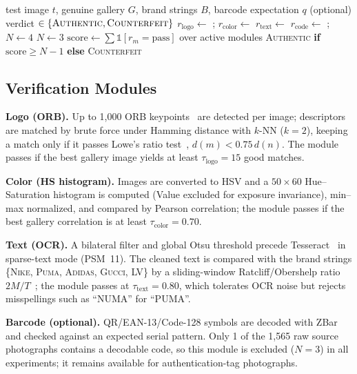 \documentclass[conference]{IEEEtran}
\begin{document}
\begin{algorithm}[t]
\caption{Master Comparator Verification}
\label{alg:cascade}
\begin{algorithmic}[1]
\Require test image $t$, genuine gallery $G$, brand strings $B$, barcode expectation $q$ (optional)
\Ensure verdict $\in \{\textsc{Authentic}, \textsc{Counterfeit}\}$
\State $r_{\text{logo}} \gets$ ; $r_{\text{color}} \gets$ 
\State $r_{\text{text}} \gets$ 
    \State $r_{\text{code}} \gets$ ; $N \gets 4$
\Else
    \State $N \gets 3$
\EndIf
\State $\text{score} \gets \sum \mathbb{1}[r_m = \text{pass}]$ over active modules
\State \Return \textsc{Authentic} \textbf{if} $\text{score} \geq N - 1$ \textbf{else} \textsc{Counterfeit}
\end{algorithmic}
\end{algorithm}

\subsection{Verification Modules}
\label{sec:modules}

\textbf{Logo (ORB).} Up to 1{,}000 ORB keypoints~\cite{orb2011} are
detected per image; descriptors are matched by brute force under Hamming
distance with $k$-NN ($k{=}2$), keeping a match only if it passes Lowe's
ratio test~\cite{lowe2004}, $d(m) < 0.75\, d(n)$. The module passes if the
best gallery image yields at least $\tau_{\text{logo}}{=}15$ good matches.

\textbf{Color (HS histogram).} Images are converted to HSV and a
$50\times60$ Hue--Saturation histogram is computed (Value excluded for
exposure invariance), min--max normalized, and compared by Pearson
correlation; the module passes if the best gallery correlation is at
least $\tau_{\text{color}}{=}0.70$.

\textbf{Text (OCR).} A bilateral filter and global Otsu threshold precede
Tesseract~\cite{tesseract2007} in sparse-text mode (PSM~11). The cleaned
text is compared with the brand strings \{\textsc{Nike}, \textsc{Puma},
\textsc{Adidas}, \textsc{Gucci}, \textsc{LV}\} by a sliding-window
Ratcliff/Obershelp ratio $2M/T$~\cite{ratcliff1988}; the module passes at
$\tau_{\text{text}}{=}0.80$, which tolerates OCR noise but rejects
misspellings such as ``NUMA'' for ``PUMA''.

\textbf{Barcode (optional).} QR/EAN-13/Code-128 symbols are decoded with
ZBar~\cite{zbar} and checked against an expected serial pattern. Only 1 of
the 1{,}565 raw source photographs contains a decodable code, so this
module is excluded ($N{=}3$) in all experiments; it remains available for
authentication-tag photographs.
\end{document}
